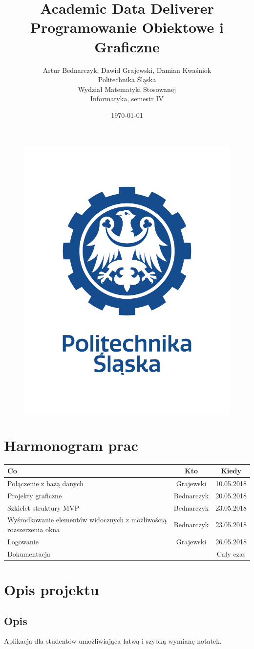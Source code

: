 \documentclass[12pt,a4paper]{article}
\title{Academic Data Deliverer\\Programowanie Obiektowe i Graficzne}
\author{Artur Bednarczyk, Dawid Grajewski, Damian Kwaśniok\\Politechnika Śląska\\Wydział Matematyki Stosowanej\\Informatyka, semestr IV}
\date{\today}
\begin{document}
	\maketitle
	\begin{figure}[H]
		\centering
		\includegraphics[width=0.5\linewidth]{LOGO2}
		\label{fig:logo}
	\end{figure}
	\clearpage
	\tableofcontents
	\clearpage
	\section{Harmonogram prac}
	\begin{tabular}{|p{}|c|c|}
	\hline
	Co & Kto & Kiedy \\	\hline\hline
	Połączenie z bazą danych & Grajewski & 10.05.2018 \\ \hline
	Projekty graficzne & Bednarczyk & 20.05.2018 \\ \hline
	Szkielet struktury MVP & Bednarczyk & 23.05.2018 \\	\hline
	Wyśrodkowanie elementów widocznych z możliwością rozszerzenia okna & Bednarczyk & 23.05.2018 \\ \hline
	Logowanie & Grajewski & 26.05.2018 \\ \hline\hline
	Dokumentacja & \makecell{Bednarczyk} & Cały czas\\ \hline
	\end{tabular}
	\clearpage
	\section{Opis projektu}
		\subsection{Opis}
			Aplikacja dla studentów umożliwiająca łatwą i szybką wymianę notatek.
\end{document}

